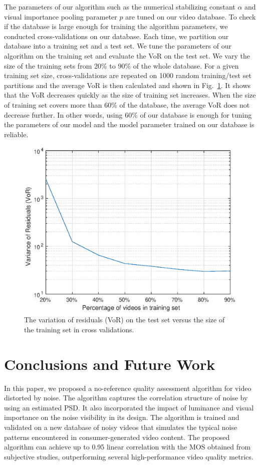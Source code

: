 \documentclass{sig-alternate}
\begin{document}
The parameters of our algorithm such as the numerical stabilizing constant $\alpha$ and visual importance pooling parameter $p$ are tuned on our video database. To check if the database is large enough for training the algorithm parameters, we conducted cross-validations on our database. Each time, we partition our database into a training set and a test set. We tune the parameters of our algorithm on the training set and evaluate the VoR on the test set. We vary the size of the training sets from 20\% to 90\% of the whole database. For a given training set size, cross-validations are repeated on 1000 random training/test set partitions and the average VoR is then calculated and shown in Fig.~\ref{fig:cross_validation}. It shows that the VoR decreases quickly as the size of training set increases. When the size of training set covers more than 60\% of the database, the average VoR does not decrease further. In other words, using 60\% of our database is enough for tuning the parameters of our model and the model parameter trained on our database is reliable. 
\begin{figure}
\includegraphics[width=\columnwidth]{./img/cross_validation.eps}
\caption{\label{fig:cross_validation} The variation of residuals (VoR) on the test set versus the size of the training set in cross validations.}
\end{figure}

\section{Conclusions and Future Work}
\label{sec:conclusion}
In this paper, we proposed a no-reference quality assessment algorithm for video distorted by noise. The algorithm captures the correlation structure of noise by using an estimated PSD. It also incorporated the impact of luminance and visual importance on the noise visibility in its design. The algorithm is trained and validated on a new database of noisy videos that simulates the typical noise patterns encountered in consumer-generated video content. The proposed algorithm can achieve up to 0.95 linear correlation with the MOS obtained from subjective studies, outperforming several high-performance video quality metrics.
\end{document}
